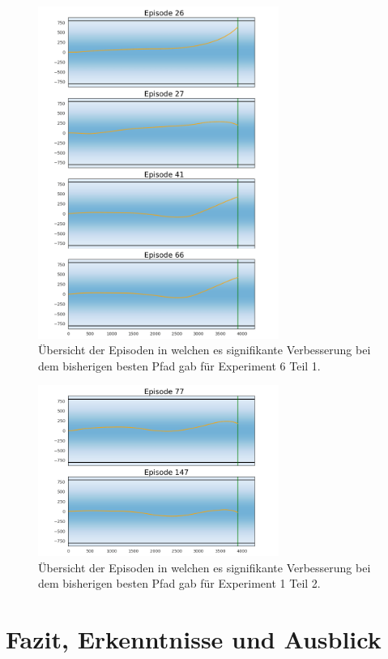 \documentclass[]{iat}
\begin{document}
\begin{figure}[H]
    \includegraphics[width=0.7\textwidth]{graphics/optimum_s6/optimum_s61.png}
    \centering
    \caption{Übersicht der Episoden in welchen es signifikante Verbesserung bei dem bisherigen besten Pfad gab für Experiment 6 Teil 1.}
    \label{abb:opti61}
\end{figure}
\begin{figure}[H]
    \includegraphics[width=0.7\textwidth]{graphics/optimum_s6/optimum_s62.png}
    \centering
    \caption{Übersicht der Episoden in welchen es signifikante Verbesserung bei dem bisherigen besten Pfad gab für Experiment 1 Teil 2.}
    \label{abb:opti62}
\end{figure}

\chapter{Fazit, Erkenntnisse und Ausblick} \label{sec:fazit_ausblick}
\end{document}
